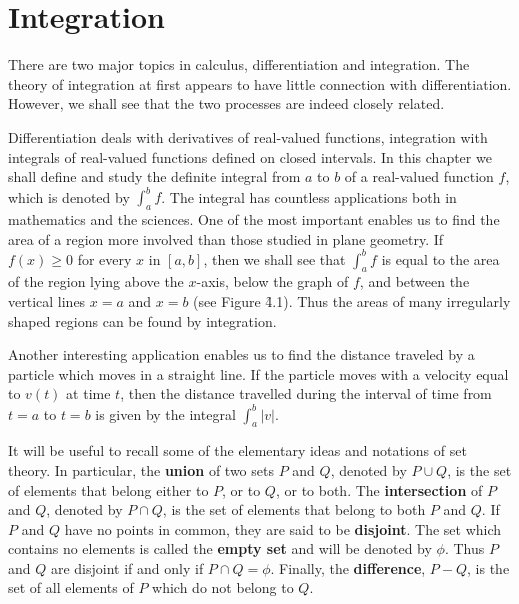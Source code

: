 \chapter{Integration}\label{chp 4}

There are two major topics in calculus, differentiation and integration. The theory of integration at first appears to have little connection with differentiation. However, we shall see that the two processes are indeed closely related.

Differentiation deals with derivatives of real-valued functions, integration with integrals of real-valued functions defined on closed intervals. In this chapter we shall define and study the definite integral from $a$ to $b$ of a real-valued function $f$, which is denoted by $\int_{a}^{b} f$. The integral has countless applications both in mathematics and the sciences. One of the most important 
enables us to find the area of a region more involved than those studied in plane geometry. If $f(x) \geq 0$ for every $x$ in $[a, b]$, then we shall see that $\int_{a}^{b} f$ is equal to the area of the region lying above the $x$-axis, below the graph of $f$, and between the vertical lines $x = a$ and $x = b$ (see Figure \f{4.1}). Thus the areas of many irregularly shaped regions can be found by integration.


Another interesting application enables us to find the distance traveled by a particle which moves in a straight line. If the particle moves with a velocity equal to $v(t)$ at time $t$, then the distance travelled during the interval of time from $t = a$ to $t = b$ is given by the integral $\int_{a}^{b} |v|$.

It will be useful to recall some of the elementary ideas and notations of set theory. In particular, the \textbf{union} of two sets $P$ and $Q$, denoted by $P \cup Q$, is the set of elements that belong either to $P$,  or to $Q$, or to both. The \textbf{intersection}
of $P$ and $Q$, denoted by $P \cap Q$, is the set of elements that belong to both $P$ and $Q$. If $P$ and $Q$ have no points in common, they are said to be \textbf{disjoint}. The set which contains no elements is called the
\textbf{empty set} and will be denoted by $\phi$. Thus $P$ and $Q$ are disjoint if and only if $P \cap Q = \phi$.  Finally, the \textbf{difference}, $P - Q$, is the set of all elements of $P$ which do not belong to $Q$.

